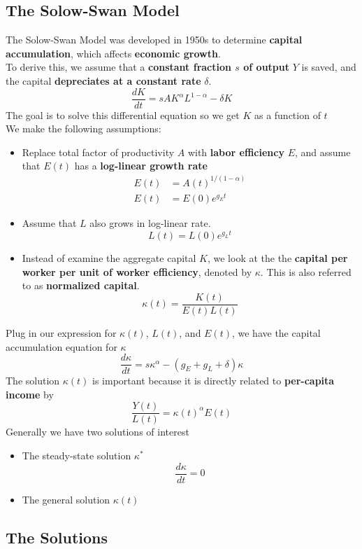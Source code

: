 \documentclass[a4paper]{article}
\renewcommand{\sb}{\vspace*{5px} \\}
\begin{document}
\subsection{The Solow-Swan Model}
The Solow-Swan Model was developed in 1950s to determine \textbf{capital accumulation}, which affects \textbf{economic growth}. \sb
To derive this, we assume that a \textbf{constant fraction $s$ of output} $Y$ is saved, and the capital \textbf{depreciates at a constant rate} $\delta$.
\begin{equation}
    \tag{Capital Accumulation Equation}
    \frac{dK}{dt} = sAK^{\alpha}L^{1-\alpha} - \delta K
\end{equation}
The goal is to solve this differential equation so we get $K$ as a function of $t$ \sb
We make the following assumptions: \begin{itemize}
    \item Replace total factor of productivity $A$ with \textbf{labor efficiency} $E$, and assume that $E(t)$ has a \textbf{log-linear growth rate}
    \begin{align*}
        E(t) &= A(t)^{1/(1-\alpha)} \\
        E(t) &= E(0)e^{g_E t}
    \end{align*}
    \item Assume that $L$ also grows in log-linear rate.
    \[ L(t) = L(0)e^{g_L t} \]
    \item Instead of examine the aggregate capital $K$, we look at the the \textbf{capital per worker per unit of worker efficiency}, denoted by $\kappa$. This 
    is also referred to as \textbf{normalized capital}.
    \[ \kappa(t) = \frac{K(t)}{E(t)L(t)} \]
\end{itemize}
Plug in our expression for $\kappa(t)$, $L(t)$, and $E(t)$, we have the capital accumulation equation for $\kappa$
\[ \frac{d\kappa}{dt} = s\kappa^\alpha - (g_E + g_L + \delta)\kappa \]
The solution $\kappa(t)$ is important because it is directly related to \textbf{per-capita income} by
\[ \frac{Y(t)}{L(t)} = \kappa(t)^\alpha E(t) \]
% 
Generally we have two solutions of interest
\begin{itemize}
    \item The steady-state solution $\kappa^*$
    \[ \frac{d\kappa}{dt} = 0 \]
    \item The general solution $\kappa(t)$
\end{itemize}


\subsection{The Solutions}
\end{document}
